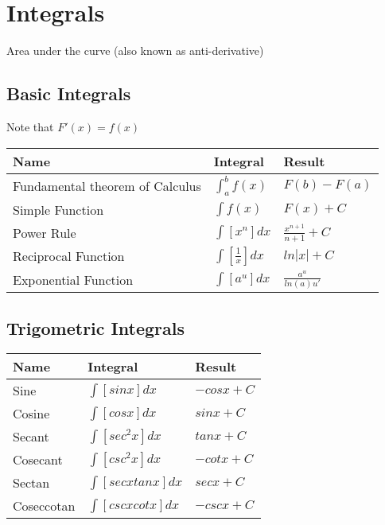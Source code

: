\documentclass[17pt]{extarticle}
\begin{document}
\section{Integrals}
Area under the curve (also known as anti-derivative)
\subsection{Basic Integrals}
Note that $F\prime(x)=f(x)$
\renewcommand{\arraystretch}{2}
\begin{table}[H]
\centering
\begin{tabular}{|l|l|l|}
\hline
\rowcolor{githublightgray}
Name & Integral & Result\\
\hline
Fundamental theorem of Calculus&$\int_{a}^{b}f(x)$&$F(b)-F(a)$\\
\hline
Simple Function & $\int f(x)$&$F(x)+C$\\
\hline
Power Rule & $\int [x^n]dx$&$\frac{x^{n+1}}{n+1}+C$\\
\hline
Reciprocal Function & $\int [\frac{1}{x}]dx$&$ln|x|+C$\\
\hline
Exponential Function & $\int [a^u]dx$&$\frac{a^u}{ln(a)u\prime}$\\
\hline
\end{tabular}
\end{table}

\subsection{Trigometric Integrals}
\renewcommand{\arraystretch}{2}
\begin{table}[H]
\centering
\begin{tabular}{|l|l|l|}
\hline
\rowcolor{githublightgray}
Name & Integral & Result\\
\hline
Sine & $\int[sinx]dx$ & $-cosx+C$\\
\hline
Cosine &$\int[cosx]dx$ & $sinx+C$\\
\hline
Secant &$\int[sec^2x]dx$&$tanx+C$\\
\hline
Cosecant &$\int[csc^2x]dx$&$-cotx+C$\\
\hline
Sectan &$\int[secxtanx]dx$&$secx+C$\\
\hline
Coseccotan&$\int[cscxcotx]dx$&$-cscx+C$\\
\hline
\end{tabular}
\end{table}
\clearpage
\end{document}
